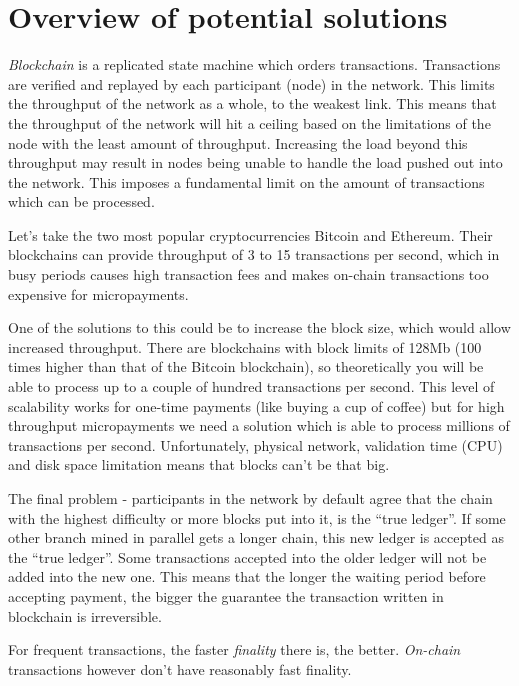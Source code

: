 \documentclass[a4paper,12pt]{article}
\begin{document}
\section{Overview of potential solutions}

\textit{Blockchain} is a replicated state machine which orders transactions. 
Transactions are verified and replayed by each participant (node) in the 
network. This limits the throughput of the network as a whole, to the weakest 
link. This means that the throughput of the network will hit a ceiling based on
the limitations of the node with the least amount of throughput. Increasing the 
load beyond this throughput may result in nodes being unable to handle the load 
pushed out into the network. This imposes a fundamental limit on the amount of 
transactions which can be processed.

Let’s take the two most popular cryptocurrencies Bitcoin and Ethereum. Their 
blockchains can provide throughput of 3 to 15 transactions per second, which in 
busy periods causes high transaction fees and makes on-chain transactions too 
expensive for micropayments. 

One of the solutions to this could be to increase the block size, which would 
allow increased throughput. There are blockchains with block limits of 128Mb 
(100 times higher than that of the Bitcoin blockchain), so theoretically you will
be able to process up to a couple of hundred transactions per second. This level 
of scalability works for one-time payments (like buying a cup of coffee) but for 
high throughput micropayments we need a solution which is able to process millions
of transactions per second. Unfortunately, physical network, validation time (CPU)
and disk space limitation means that blocks can’t be that big.

The final problem - participants in the network by default agree that the chain 
with the highest difficulty or more blocks put into it, is the “true ledger”. If 
some other branch mined in parallel gets a longer chain, this new ledger is 
accepted as the “true ledger”. Some transactions accepted into the older ledger 
will not be added into the new one. This means that the longer the waiting period 
before accepting payment, the bigger the guarantee the transaction written in 
blockchain is irreversible.

For frequent transactions, the faster \textit{finality} there is, the better. 
\textit{On-chain} transactions however don’t have reasonably fast finality.\\
\end{document}
